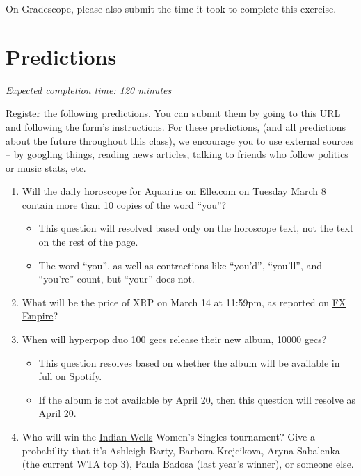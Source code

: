 \documentclass[11pt]{article}
\begin{document}
On Gradescope, please also submit the time it took to complete this exercise.

\section*{Predictions}

\emph{Expected completion time: 120 minutes}

Register the following predictions. You can submit them by going to \href{https://docs.google.com/forms/d/e/1FAIpQLSfGARO8mpj0GiFtOKuuVa9eBnkq6g2dTJU53qfqTmhQLDaZFg/viewform?usp=sf_link}{this URL} and following the form's instructions. For these predictions, (and all predictions about the future throughout this class), we encourage you to use external sources -- by googling things, reading news articles, talking to friends who follow politics or music stats, etc.

\begin{enumerate}
	\item Will the \href{https://www.elle.com/horoscopes/daily/a107/aquarius-daily-horoscope/}{daily horoscope} for Aquarius on Elle.com on Tuesday March 8 contain more than 10 copies of the word ``you''?
	\begin{itemize}
		\item This question will resolved based only on the horoscope text, not the text on the rest of the page.
		\item The word ``you'', as well as contractions like ``you'd'', ``you'll'', and ``you're'' count, but ``your'' does not.
	\end{itemize}
	\item What will be the price of XRP on March 14 at 11:59pm, as reported on \href{https://www.fxempire.com/crypto/xrp}{FX Empire}?
	\item When will hyperpop duo \href{https://en.wikipedia.org/wiki/100_Gecs}{100 gecs} release their new album, 10000 gecs?
	\begin{itemize}
		\item This question resolves based on whether the album will be available in full on Spotify.
		\item If the album is not available by April 20, then this question will resolve as April 20.
	\end{itemize}
	\item Who will win the \href{https://bnpparibasopen.com/players/current/?assoc=wta&type=singles}{Indian Wells} Women's Singles tournament? Give a probability that it's Ashleigh Barty, Barbora Krejcikova, Aryna Sabalenka (the current WTA top 3), Paula Badosa (last year's winner), or someone else.
\end{enumerate}
\end{document}
